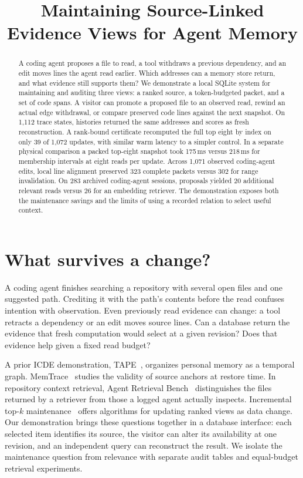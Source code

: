 \documentclass[conference]{IEEEtran}
\title{Maintaining Source-Linked Evidence Views for Agent Memory}
\author{\IEEEauthorblockN{Anonymous authors}}
\begin{document}
\maketitle
\begin{abstract}
A coding agent proposes a file to read, a tool withdraws a previous dependency, and an edit moves lines the agent read earlier. Which addresses can a memory store return, and what evidence still supports them? We demonstrate a local SQLite system for maintaining and auditing three views: a ranked source, a token-budgeted packet, and a set of code spans. A visitor can promote a proposed file to an observed read, rewind an actual edge withdrawal, or compare preserved code lines against the next snapshot. On 1,112 trace states, histories returned the same addresses and scores as fresh reconstruction. A rank-bound certificate recomputed the full top eight by index on only 39 of 1,072 updates, with similar warm latency to a simpler control. In a separate physical comparison a packed top-eight snapshot took 175\,ms versus 218\,ms for membership intervals at eight reads per update. Across 1,071 observed coding-agent edits, local line alignment preserved 323 complete packets versus 302 for range invalidation. On 283 archived coding-agent sessions, proposals yielded 20 additional relevant reads versus 26 for an embedding retriever. The demonstration exposes both the maintenance savings and the limits of using a recorded relation to select useful context.
\end{abstract}

\section{What survives a change?}
A coding agent finishes searching a repository with several open files and one suggested path. Crediting it with the path's contents before the read confuses intention with observation. Even previously read evidence can change: a tool retracts a dependency or an edit moves source lines. Can a database return the evidence that fresh computation would select at a given revision? Does that evidence help given a fixed read budget?

A prior ICDE demonstration, TAPE~\cite{tape}, organizes personal memory as a temporal graph. MemTrace~\cite{memtrace} studies the validity of source anchors at restore time. In repository context retrieval, Agent Retrieval Bench~\cite{arb} distinguishes the files returned by a retriever from those a logged agent actually inspects. Incremental top-$k$ maintenance~\cite{topk} offers algorithms for updating ranked views as data change. Our demonstration brings these questions together in a database interface: each selected item identifies its source, the visitor can alter its availability at one revision, and an independent query can reconstruct the result. We isolate the maintenance question from relevance with separate audit tables and equal-budget retrieval experiments.
\end{document}
